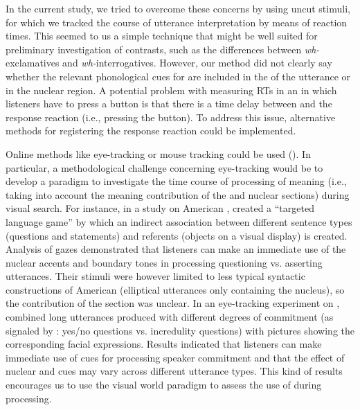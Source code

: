 \documentclass[output=paper]{langsci/langscibook}
\begin{document}
In the current study, we tried to overcome these concerns by using uncut stimuli, for which we tracked the course of utterance interpretation by means of reaction times. This seemed to us a simple technique that might be well suited for preliminary investigation of  contrasts, such as the  differences between \textit{wh-}exclamatives and \textit{wh-}interrogatives. However, our method did not clearly say whether the relevant phonological cues for  are included in the  of the utterance or in the nuclear region. A potential problem with measuring RTs in an  in which listeners have to press a button is that there is a time delay between  and the response reaction (i.e., pressing the button). To address this issue, alternative methods for registering the response reaction could be implemented.

Online methods like eye-tracking or mouse tracking could be used (\citealt{Marslen-Wilson1992,Pynte1996,Tomlinson2011,Warren2014}). In particular, a methodological challenge concerning eye-tracking would be to develop a paradigm to investigate the time course of processing of  meaning (i.e., taking into account the meaning contribution of the  and nuclear sections) during visual search. For instance, in a study on American , \citet{Heeren.2015} created a “targeted language game” by which an indirect association between different sentence types (questions and statements) and referents (objects on a visual display) is created. Analysis of gazes demonstrated that listeners can make an immediate use of the nuclear accents and boundary tones in processing questioning vs. asserting utterances. Their stimuli were however limited to less typical syntactic constructions of American  (elliptical utterances only containing the nucleus), so the contribution of the  section was unclear. In an eye-tracking experiment on , \citet{petroneETAL2016} combined long utterances produced with different degrees of commitment (as signaled by : yes/no questions vs. incredulity questions) with pictures showing the corresponding facial expressions. Results indicated that  listeners can make immediate use of  cues for processing speaker commitment and that the effect of nuclear and  cues may vary across different utterance types. This kind of results encourages us to use the visual world paradigm to assess the use of  during  processing.
\end{document}
